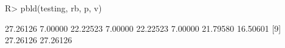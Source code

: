 \begin{Schunk}
% --begin: "pbld6"
\begin{Sinput}
R> pbld(testing, rb, p, v)
\end{Sinput}
\begin{Soutput}
 [1] 27.26126  7.00000 22.22523  7.00000 22.22523  7.00000 21.79580 16.50601
 [9] 27.26126 27.26126
\end{Soutput}
%
% --end: "pbld6"
\end{Schunk}
